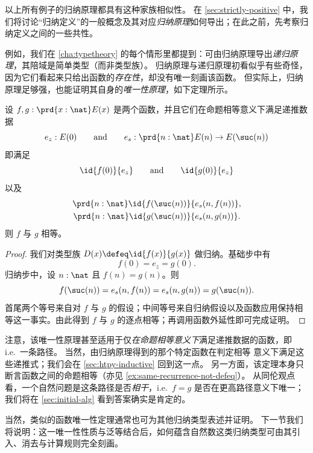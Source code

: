 以上所有例子的归纳原理都具有这种家族相似性。
在 \cref{sec:strictly-positive} 中，我们将讨论“归纳定义”的一般概念及其对应\emph{归纳原理}如何导出；在此之前，先考察归纳定义之间的一些共性。

%
例如，我们在 \cref{cha:typetheory} 的每个情形里都提到：可由归纳原理导出\emph{递归原理}，其陪域是简单类型（而非类型族）。
归纳原理与递归原理初看似乎有些奇怪，因为它们看起来只给出函数的\emph{存在性}，却没有唯一刻画该函数。
但实际上，归纳原理足够强，也能证明其自身的\emph{唯一性原理}，如下定理所示。

\begin{thm}\label{thm:nat-uniq}
设 $f,g : \prd{x:\nat} E(x)$ 是两个函数，并且它们在命题相等意义下满足递推数据
%
\begin{equation*}
  e_z : E(0)
  \qquad\text{and}\qquad
  e_s : \prd{n : \nat} E(n) \to E(\suc(n))
\end{equation*}
%
即满足
\begin{equation*}
  \id{f(0)}{e_z}
  \qquad\text{and}\qquad
  \id{g(0)}{e_z}
\end{equation*}
以及
\begin{gather*}
  \prd{n : \nat} \id{f(\suc(n))}{e_s(n, f(n))},\\
  \prd{n : \nat} \id{g(\suc(n))}{e_s(n, g(n))}.
\end{gather*}
则 $f$ 与 $g$ 相等。
\end{thm}

\begin{proof}
我们对类型族 $D(x) \defeq \id{f(x)}{g(x)}$ 做归纳。基础步中有
\[ f(0) = e_z = g(0). \]
归纳步中，设 $n : \nat$ 且 $f(n) = g(n)$。则
\[ f(\suc(n)) = e_s(n, f(n)) = e_s(n, g(n)) = g(\suc(n)). \]
首尾两个等号来自对 $f$ 与 $g$ 的假设；中间等号来自归纳假设以及函数应用保持相等这一事实。由此得到 $f$ 与 $g$ 的逐点相等；再调用函数外延性即可完成证明。
\end{proof}

注意，该唯一性原理甚至适用于仅\emph{在命题相等意义下}满足递推数据的函数，即 i.e.\ 一条路径。
当然，由归纳原理得到的那个特定函数在判定相等 意义下满足这些递推式；我们会在 \cref{sec:htpy-inductive} 回到这一点。
另一方面，该定理本身只断言函数之间的命题相等（亦见 \cref{ex:same-recurrence-not-defeq}）。
从同伦观点看，一个自然问题是这条路径是否\emph{相干}，i.e.\ $f=g$ 是否在更高路径意义下唯一；我们将在 \cref{sec:initial-alg} 看到答案确实是肯定的。

当然，类似的函数唯一性定理通常也可为其他归纳类型表述并证明。
下一节我们将说明：这一唯一性性质与泛等结合后，如何蕴含自然数这类归纳类型可由其引入、消去与计算规则完全刻画。

